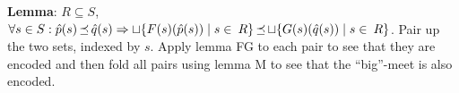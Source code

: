 

\textbf{Lemma}: $R \subseteq S$, $\forall s \in S : \hat p(s) \operatorname{\mathrel{\preceq}} \hat q(s) \Rightarrow \sqcup \{ F(s)(\hat p(s)) \mid s \in \: R \} \operatorname{\mathrel{\preceq}} \sqcup \{ G(s)(\hat q(s)) \mid s \in \: R \}$. Pair up the two sets, indexed by $s$. Apply lemma FG to each pair to see that they are encoded and then fold all pairs using lemma M to see that the ``big''-meet is also encoded.

